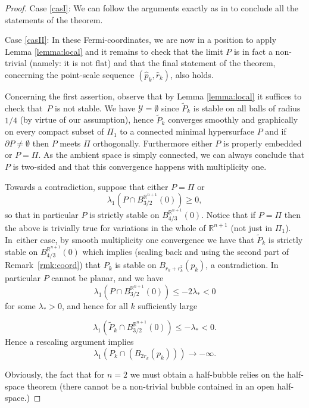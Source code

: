 \documentclass[JEP,XML,SOM,Unicode]{cedram}
\let\mathcal\mathscr
\newcounter{cas}
\theoremstyle{definition}
\newcommand{\R}{\mathbb{R}}
\begin{document}
\begin{proof}

Case \ref{casI}: We can follow the arguments exactly as in \cite[Cor.\,2.6]{BS17} to conclude all the statements of the theorem.

Case \ref{casII}:
In these Fermi-coordinates, we are now in a position to apply Lemma \ref{lemma:local} and it remains to check that the limit $P$ is in fact a non-trivial (namely: it is not flat) and that the final statement of the theorem, concerning the point-scale sequence $(\widehat{p}_k,\widehat{r}_k)$, also holds.

Concerning the first assertion, observe that by Lemma \ref{lemma:local} it suffices to check that~$P$ is not stable.
We have $\mathcal{Y}=\emptyset$ since $\widetilde{P}_k$ is stable on all balls of radius $1/4$ (by virtue of our assumption), hence $\widetilde{P}_k$ converges smoothly and graphically on every compact subset of $\Pi_1$ to a connected minimal hypersurface $P$ and if $\partial P\neq\emptyset$ then $P$ meets $\Pi$ orthogonally. Furthermore either $P$ is properly embedded or $P=\Pi$.
As the ambient space is simply connected, we can always conclude that $P$ is two-sided and that this convergence happens with multiplicity one.

Towards a contradiction, suppose that either $P=\Pi$ or
$$\lambda_1(P\cap B^{\R^{n+1}}_{3/2}(0))\geq 0,$$ so that in particular $P$ is strictly stable on $B^{\R^{n+1}}_{4/3}(0)$. Notice that if $P=\Pi$ then the above is trivially true for variations in the whole of $\R^{n+1}$ (\ie not just in $\Pi_1$). In~either case, by smooth multiplicity one convergence we have that $\widetilde{P}_k$ is strictly stable on $B^{\R^{n+1}}_{4/3}(0)$ which implies (scaling back and using the second part of Remark~\ref{rmk:coord}) that $P_k$ is stable on $B_{r_k + r_k^2}(p_k)$, a contradiction. In particular $P$ cannot be planar, and we have
$$\lambda_1(P\cap B^{\R^{n+1}}_{3/2}(0))\leq -2\lambda_{\ast} < 0$$ for some $\lambda_{\ast}>0$, and hence for all $k$ sufficiently large

$$\lambda_1(\widetilde{P}_k\cap B^{\R^{n+1}}_{3/2}(0))\leq -\lambda_{\ast}<0.$$
Hence a rescaling argument implies $$\lambda_1(P_k \cap (B_{2r_k}(p_k)))\to -\infty.$$

Obviously, the fact that for $n=2$ we must obtain a half-bubble relies on the half-space theorem \cite{HM90} (\ie there cannot be a non-trivial bubble contained in an open half-space.)


\end{proof}
\end{document}
